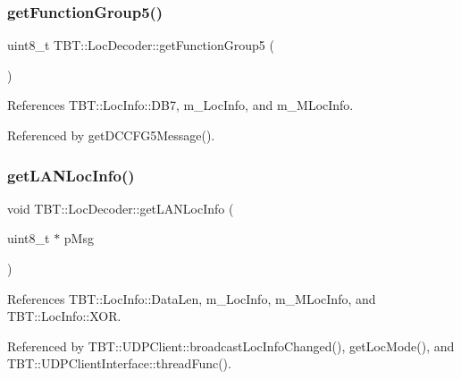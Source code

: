 \subsubsection{\texorpdfstring{get\+Function\+Group5()}{getFunctionGroup5()}}
{\footnotesize\ttfamily uint8\+\_\+t T\+B\+T\+::\+Loc\+Decoder\+::get\+Function\+Group5 (\begin{DoxyParamCaption}{ }\end{DoxyParamCaption})\hspace{0.3cm}{\ttfamily [inline]}}



References T\+B\+T\+::\+Loc\+Info\+::\+D\+B7, m\+\_\+\+Loc\+Info, and m\+\_\+\+M\+Loc\+Info.



Referenced by get\+D\+C\+C\+F\+G5\+Message().

\mbox{\label{classTBT_1_1LocDecoder_a257c294961f07e5f2134b1550355a661_a257c294961f07e5f2134b1550355a661}} 
\subsubsection{\texorpdfstring{get\+L\+A\+N\+Loc\+Info()}{getLANLocInfo()}}
{\footnotesize\ttfamily void T\+B\+T\+::\+Loc\+Decoder\+::get\+L\+A\+N\+Loc\+Info (\begin{DoxyParamCaption}\item[{uint8\+\_\+t $\ast$}]{p\+Msg }\end{DoxyParamCaption})}



References T\+B\+T\+::\+Loc\+Info\+::\+Data\+Len, m\+\_\+\+Loc\+Info, m\+\_\+\+M\+Loc\+Info, and T\+B\+T\+::\+Loc\+Info\+::\+X\+OR.



Referenced by T\+B\+T\+::\+U\+D\+P\+Client\+::broadcast\+Loc\+Info\+Changed(), get\+Loc\+Mode(), and T\+B\+T\+::\+U\+D\+P\+Client\+Interface\+::thread\+Func().

\mbox{\label{classTBT_1_1LocDecoder_a14a2d03a9f667ebfc4472fab880271b7_a14a2d03a9f667ebfc4472fab880271b7}} 
